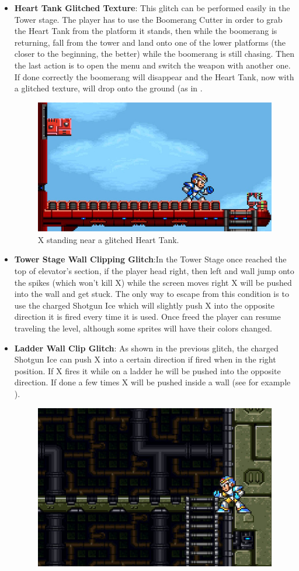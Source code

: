 \begin{itemize}
	\item \textbf{Heart Tank Glitched Texture}: This glitch can be performed easily in the Tower stage. The player has to use the Boomerang Cutter in order to grab the Heart Tank from the platform it stands, then while the boomerang is returning, fall from the tower and land onto one of the lower platforms (the closer to the beginning, the better) while the boomerang is still chasing. Then the last action is to open the menu and switch the weapon with another one. If done correctly the boomerang will disappear and the Heart Tank, now with a glitched texture, will drop onto the ground (as in .
	\begin{figure}[htp]
		\centering
		\includegraphics[width=0.5\linewidth]{figures/X1/Miscs/Tower_glitched_heart.jpg}
		\caption{X standing near a glitched Heart Tank.}
	\end{figure}
	\item \textbf{Tower Stage Wall Clipping Glitch}:In the Tower Stage once reached the top of elevator's section, if the player head right, then left and wall jump onto the spikes (which won't kill X) while the screen moves right X will be pushed into the wall and get stuck. The only way to escape from this condition is to use the charged Shotgun Ice which will slightly push X into the opposite direction it is fired every time it is used. Once freed the player can resume traveling the level, although some sprites will have their colors changed.
	\item \textbf{Ladder Wall Clip Glitch}: As shown in the previous glitch, the charged Shotgun Ice can push X into a certain direction if fired when in the right position. If X fires it while on a ladder he will be pushed into the opposite direction. If done a few times X will be pushed inside a wall (see for example ).
	\begin{figure}[htp]
		\centering
		\includegraphics[width=0.5\linewidth]{figures/X1/Miscs/Wall_clipping.jpg}

\end{figure}
\end{itemize}
